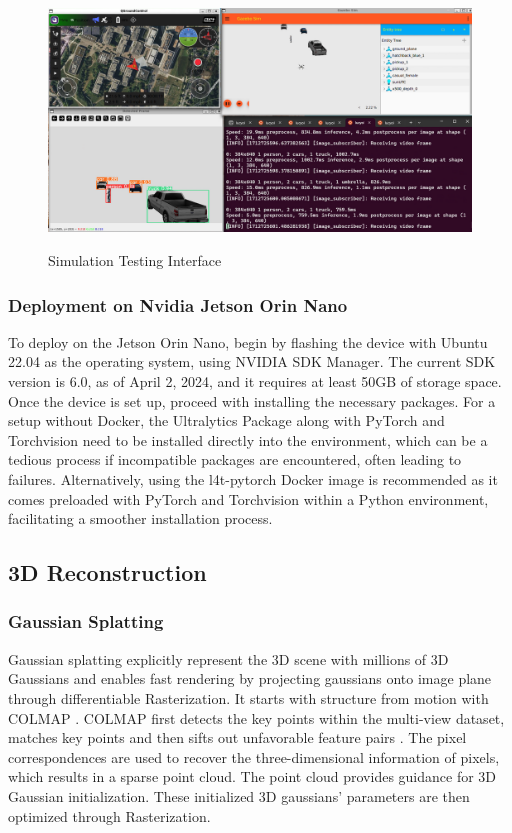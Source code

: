 \documentclass[conference]{IEEEtran}
\begin{document}
\begin{figure}[htbp]
    \centering
    \resizebox{9cm}{5cm}
    {\includegraphics{figures/gazebo_simulation_interface.png}}
    \caption{Simulation Testing Interface}
    \label{interface}
\end{figure}
\subsubsection{Deployment on Nvidia Jetson Orin Nano}

To deploy on the Jetson Orin Nano, begin by flashing the device with Ubuntu 22.04 as the operating system, using NVIDIA SDK Manager. The current SDK version is 6.0, as of April 2, 2024, and it requires at least 50GB of storage space. Once the device is set up, proceed with installing the necessary packages. For a setup without Docker, the Ultralytics Package along with PyTorch and Torchvision need to be installed directly into the environment, which can be a tedious process if incompatible packages are encountered, often leading to failures. Alternatively, using the l4t-pytorch Docker image is recommended as it comes preloaded with PyTorch and Torchvision within a Python environment, facilitating a smoother installation process.
\subsection{3D Reconstruction}
\subsubsection{Gaussian Splatting}
Gaussian splatting \cite{3dgs} explicitly represent the 3D scene with millions of 3D Gaussians and enables fast rendering by projecting gaussians onto image plane through differentiable Rasterization. It starts with structure from motion with COLMAP \cite{colmap}. COLMAP first detects the key points within the multi-view dataset, matches key points and then sifts out unfavorable feature pairs \cite{ransac}. The pixel correspondences are used to recover the three-dimensional information of pixels, which results in a sparse point cloud. The point cloud provides guidance for 3D Gaussian initialization. These initialized 3D gaussians' parameters are then optimized through Rasterization.
\end{document}
